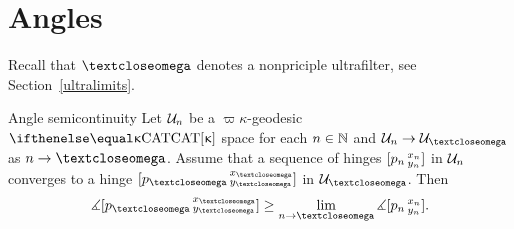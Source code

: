 





\section{Angles}
\label{sec:angles-cba}

Recall that $\o$ denotes a nonpriciple ultrafilter, see Section~\ref{ultralimits}. 

\begin{thm}{Angle semicontinuity}\label{lem:ang.semicont}
Let $\mathcal{U}_n$  be a $\varpi\kappa$-geodesic $\CAT\kappa$  space for each $n\in \NN$
and $\spc{U}_n\to \spc{U}_\o$ as $n\to\o$.
Assume that a sequence of hinges $[p_n\,{}^{x_n}_{y_n}]$ in $\mathcal{U}_n$ converges to a hinge $\hinge{p_\o}{x_\o}{y_\o}$ in  $\spc{U}_\o$.
Then 
\[\mangle\hinge{p_\o}{x_\o}{y_\o}
\ge 
\lim_{n\to\o} \mangle\hinge{p_n}{x_n}{y_n}.\]

\end{thm}

